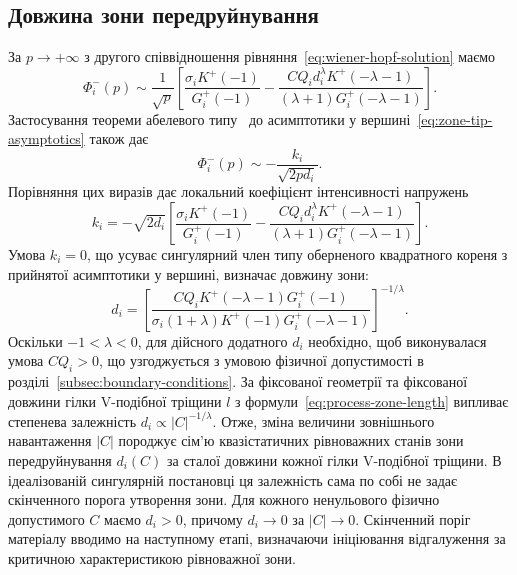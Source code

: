 \subsection{Довжина зони передруйнування}
\label{subsec:zone-length}

За $p\to+\infty$ з другого співвідношення рівняння~\eqref{eq:wiener-hopf-solution} маємо
\begin{equation*}
  \Phi_i^-(p)\sim\frac{1}{\sqrt{p}}
  \left[
    \frac{\sigma_iK^+(-1)}{G_i^+(-1)}
    -\frac{CQ_i d_i^\lambda K^+(-\lambda-1)}
    {(\lambda+1)G_i^+(-\lambda-1)}
  \right].
\end{equation*}
Застосування теореми абелевого типу~\citep{noble1958wienerhopf} до асимптотики у вершині~\eqref{eq:zone-tip-asymptotics} також дає
\begin{equation*}
  \Phi_i^-(p)\sim-\frac{k_i}{\sqrt{2pd_i}}.
\end{equation*}
Порівняння цих виразів дає локальний коефіцієнт інтенсивності напружень
\begin{equation*}
  k_i=-\sqrt{2d_i}
  \left[
    \frac{\sigma_iK^+(-1)}{G_i^+(-1)}
    -\frac{CQ_i d_i^\lambda K^+(-\lambda-1)}
    {(\lambda+1)G_i^+(-\lambda-1)}
  \right].
\end{equation*}
Умова $k_i=0$, що усуває сингулярний член типу оберненого квадратного кореня з прийнятої асимптотики у вершині, визначає довжину зони:
\begin{equation}
\label{eq:process-zone-length}
  d_i=
  \left[
    \frac{CQ_iK^+(-\lambda-1)G_i^+(-1)}
    {\sigma_i(1+\lambda)K^+(-1)G_i^+(-\lambda-1)}
  \right]^{-1/\lambda}.
\end{equation}
Оскільки $-1<\lambda<0$, для дійсного додатного $d_i$ необхідно, щоб виконувалася умова $CQ_i>0$, що узгоджується з умовою фізичної допустимості в розділі~\ref{subsec:boundary-conditions}. За фіксованої геометрії та фіксованої довжини гілки V-подібної тріщини $l$ з формули~\eqref{eq:process-zone-length} випливає степенева залежність $d_i\propto |C|^{-1/\lambda}$. Отже, зміна величини зовнішнього навантаження $|C|$ породжує сім’ю квазістатичних рівноважних станів зони передруйнування $d_i(C)$ за сталої довжини кожної гілки V-подібної тріщини. В ідеалізованій сингулярній постановці ця залежність сама по собі не задає скінченного порога утворення зони. Для кожного ненульового фізично допустимого $C$ маємо $d_i>0$, причому $d_i\to0$ за $|C|\to0$. Скінченний поріг матеріалу вводимо на наступному етапі, визначаючи ініціювання відгалуження за критичною характеристикою рівноважної зони.

